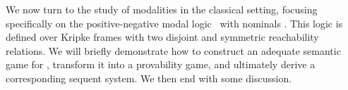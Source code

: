 
We now turn to the study of modalities in the classical setting, focusing specifically on the positive-negative modal logic \PNL\ with nominals \cite{DBLP:journals/jolli/XiongA20,DBLP:journals/logcom/PedersenSA21}. This logic is defined over Kripke frames with two disjoint and symmetric reachability relations. We will briefly demonstrate how to construct an adequate semantic game for \PNL, transform it into a provability game, and ultimately derive a corresponding sequent system. We then end with some discussion.